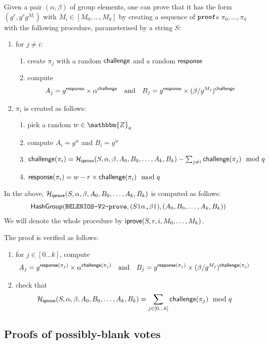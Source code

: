 \documentclass[a4paper]{article}
\newcommand{\dstprefix}{BELENIOS-V2}
\newcommand{\Z}{\mathbbm{Z}}
\begin{document}
Given a pair $(\alpha,\beta)$ of group elements, one can prove that it
has the form $(g^r,y^rg^{M_i})$ with $M_i\in[M_0,\dots,M_k]$ by
creating a sequence of $\texttt{proof}$s $\pi_0,\dots,\pi_k$ with the
following procedure, parameterised by a string $S$:
\begin{enumerate}
\item for $j\neq i$:
  \begin{enumerate}
  \item create $\pi_j$ with a random $\textsf{challenge}$ and a random
    $\textsf{response}$
  \item compute
    \[A_j={g^{\textsf{response}}}\times{\alpha^{\textsf{challenge}}}\quad\text{and}\quad
    B_j={y^{\textsf{response}}}\times{(\beta/g^{M_j})^{\textsf{challenge}}}\]
  \end{enumerate}
\item $\pi_i$ is created as follows:
  \begin{enumerate}
  \item pick a random $w\in\Z_q$
  \item compute $A_i=g^w$ and $B_i=y^w$
  \item $\textsf{challenge}(\pi_i)=\mathcal{H}_{\textsf{iprove}}(S,\alpha,\beta,A_0,B_0,\dots,A_k,B_k)-\sum_{j\neq
      i}\textsf{challenge}(\pi_j)\mod q$
  \item $\textsf{response}(\pi_i)=w-r\times\textsf{challenge}(\pi_i)\mod q$
  \end{enumerate}
\end{enumerate}
In the above, $\mathcal{H}_{\textsf{iprove}}(S,\alpha,\beta,A_0,B_0,\dots,A_k,B_k)$ is computed as follows:
\[\textsf{HashGroup}(\texttt{\dstprefix-prove},(S\verb=|=\alpha\verb=,=\beta\verb=|=),(A_0,B_0,\dotsc,A_k,B_k))\]
We will denote the whole procedure by $\textsf{iprove}(S,r,i,M_0,\dots,M_k)$.

The proof is verified as follows:
\begin{enumerate}
\item for $j\in[0\dots k]$, compute
  \[A_j={g^{\textsf{response}(\pi_j)}}\times{\alpha^{\textsf{challenge}(\pi_j)}}\quad\text{and}\quad
  B_j={y^{\textsf{response}(\pi_j)}}\times{(\beta/g^{M_j})^{\textsf{challenge}(\pi_j)}}\]
\item check that
  \[\mathcal{H}_{\textsf{iprove}}(S,\alpha,\beta,A_0,B_0,\dots,A_k,B_k)=\sum_{j\in[0\dots
    k]}\textsf{challenge}(\pi_j)\mod q\]
\end{enumerate}

\subsection{Proofs of possibly-blank votes}
\label{bproof}
\end{document}

